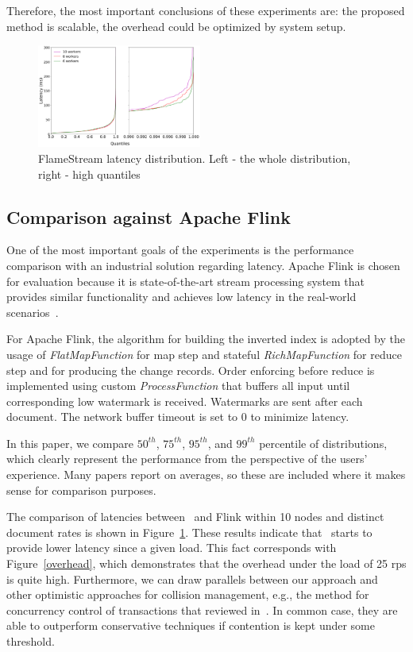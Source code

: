 Therefore, the most important conclusions of these experiments are: the proposed method is scalable, the overhead could be optimized by system setup.

\begin{figure}[htbp]
  \centering
  \includegraphics[width=0.48\textwidth]{pics/fs-index-quantiles}
  \caption{FlameStream latency distribution. Left - the whole distribution, right - high quantiles}
  \label {fs-index-quantiles}
\end{figure}

\subsection{Comparison against Apache Flink}

One of the most important goals of the experiments is the performance comparison with an industrial solution regarding latency. Apache Flink is chosen for evaluation because it is state-of-the-art stream processing system that provides similar functionality and achieves low latency in the real-world scenarios~\cite{S7530084}. 

For Apache Flink, the algorithm for building the inverted index is adopted by the usage of {\it FlatMapFunction} for map step and stateful {\it RichMapFunction} for reduce step and for producing the change records. Order enforcing before reduce is implemented using custom {\it ProcessFunction} that buffers all input until corresponding low watermark is received. Watermarks are sent after each document. The network buffer timeout is set to 0 to minimize latency.

In this paper, we compare $50^{th}$, $75^{th}$, $95^{th}$, and $99^{th}$ percentile of distributions, which clearly represent the performance from the perspective of the users' experience. Many papers report on averages, so these are included where it makes sense for comparison purposes. 

The comparison of latencies between \FlameStream\ and Flink within 10 nodes and distinct document rates is shown in Figure~\ref{fs-index-quantiles}. These results indicate that \FlameStream\ starts to provide lower latency since a given load. This fact corresponds with Figure~\ref{overhead}, which demonstrates that the overhead under the load of 25 rps is quite high. Furthermore, we can draw parallels between our approach and other optimistic approaches for collision management, e.g., the method for concurrency control of transactions that reviewed in~\cite{Cahill:2009:SIS:1620585.1620587}. In common case, they are able to outperform conservative techniques if contention is kept under some threshold.

